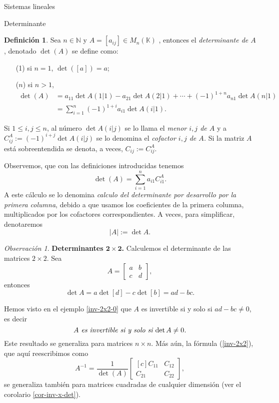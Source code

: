 \documentclass[a4paper,12pt,twoside,spanish,reqno]{amsbook}
\theoremstyle{definition}
\newtheorem{definicion}{Definici\'on}[section]
\theoremstyle{remark}
\newtheorem{obs}{Observaci\'on}[section]
\newcommand{\C}{\mathbb C}
\newcommand{\K}{\mathbb K}
\begin{document}
\begin{chapter}{Sistemas lineales}
\begin{section}{Determinante}
	\begin{definicion}
		Sea $n \in \mathbb N$ y $A =[a_{ij}] \in M_n(\K)$ , entonces el \textit{determinante de $A$}, denotado $\det(A)$ se define como:
		\begin{enumerate}
			\item[(1)] si $n=1$,  $\det([a]) =a$;
			\item[($n$)] si $n >1$, 
			\begin{align*}
			\det(A) &=  a_{11}\det A(1|1) - a_{21}\det A(2|1) + \cdots + (-1)^{1+n}  a_{n1}\det A(n|1) \\
			&= \sum_{i=1}^{n} (-1)^{1+i}  a_{i1}\det A(i|1).
			\end{align*}
		\end{enumerate}
		Si  $1 \le i,j \le n$, al número $\det A(i|j)$ se lo llama el \textit{menor $i,j$ de $A$} y a $C^A_{ij}:= (-1)^{i+j} \det A(i|j)$ se lo denomina  el \textit{cofactor $i,j$ de $A$.} Si la matriz $A$ está sobreentendida se denota, a veces, $C_{ij} := C^A_{ij}$.
	\end{definicion}
	
	Observemos, que con las definiciones introducidas  tenemos
	\begin{equation}\label{def-determinante}
	\det(A) = \sum_{i=1}^{n}  a_{i1}C^A_{i1}.
	\end{equation}
	A este cálculo  se lo denomina \textit{calculo del determinante por desarrollo por la primera columna}, debido  a que usamos los coeficientes de la primera columna,  multiplicados por los cofactores correspondientes. A veces, para simplificar,  denotaremos
	$$
	|A| := \det A.
	$$
	
	\begin{obs}\textbf{Determinantes $\mathbf{2 \times 2}$.} Calculemos el determinante de las matrices $2 \times 2$. Sea 
		$$A=\begin{bmatrix}a&b\\c&d\end{bmatrix},$$  entonces
		$$
		\det A = a \det [d] - c \det [b] = ad-bc.
		$$
		
		Hemos visto en el ejemplo \ref{inv-2x2-0} que $A$ es invertible si y solo si $ ad-bc \not=0$,  es decir 
		\begin{equation}
		\text{\textit{$A$ es invertible si y solo si $ \det A \not=0$.}}
		\end{equation}
		Este resultado se generaliza para matrices $n \times n$. Más aún, la fórmula (\ref{inv-2x2}),  que aquí reescribimos como
		\begin{equation*}
			A^{-1} = \dfrac{1}{\det(A)}
			\begin{bmatrix*}[c]C_{11}&C_{12}\\C_{21}&C_{22}\end{bmatrix*},
		\end{equation*} se generaliza también para matrices cuadradas de cualquier dimensión (ver el corolario \ref{cor-inv-x-det}).
	\end{obs}
	

\end{section}
\end{chapter}
\end{document}
